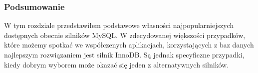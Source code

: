 \subsubsection{Podsumowanie}

W tym rozdziale przedstawiłem podstawowe własności najpopularniejszych dostępnych obecnie silników MySQL. W zdecydowanej większości przypadków, które możemy spotkać we współczenych aplikacjach, korzystających z baz danych najlepszym rozwiązaniem jest silnik InnoDB. Są jednak specyficzne przypadki, kiedy dobrym wyborem może okazać się jeden z alternatywnych silników.
